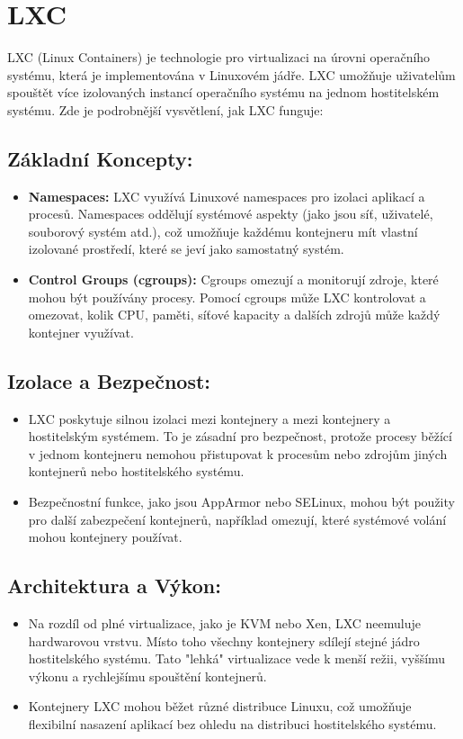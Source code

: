 \section{LXC}
LXC (Linux Containers) je technologie pro virtualizaci na úrovni operačního systému, která je implementována v Linuxovém jádře. LXC umožňuje uživatelům spouštět více izolovaných instancí operačního systému na jednom hostitelském systému. Zde je podrobnější vysvětlení, jak LXC funguje:

\subsection{Základní Koncepty:}
\begin{itemize}[label=]
    \item \textbf{Namespaces:} LXC využívá Linuxové namespaces pro izolaci aplikací a procesů. Namespaces oddělují systémové aspekty (jako jsou síť, uživatelé, souborový systém atd.), což umožňuje každému kontejneru mít vlastní izolované prostředí, které se jeví jako samostatný systém.
    \item \textbf{Control Groups (cgroups):} Cgroups omezují a monitorují zdroje, které mohou být používány procesy. Pomocí cgroups může LXC kontrolovat a omezovat, kolik CPU, paměti, síťové kapacity a dalších zdrojů může každý kontejner využívat.
\end{itemize}

\subsection{Izolace a Bezpečnost:}
\begin{itemize}[label=]
    \item LXC poskytuje silnou izolaci mezi kontejnery a mezi kontejnery a hostitelským systémem. To je zásadní pro bezpečnost, protože procesy běžící v jednom kontejneru nemohou přistupovat k procesům nebo zdrojům jiných kontejnerů nebo hostitelského systému.
    \item Bezpečnostní funkce, jako jsou AppArmor nebo SELinux, mohou být použity pro další zabezpečení kontejnerů, například omezují, které systémové volání mohou kontejnery používat.
\end{itemize}

\subsection{Architektura a Výkon:}
\begin{itemize}[label=]
    \item Na rozdíl od plné virtualizace, jako je KVM nebo Xen, LXC neemuluje hardwarovou vrstvu. Místo toho všechny kontejnery sdílejí stejné jádro hostitelského systému. Tato "lehká" virtualizace vede k menší režii, vyššímu výkonu a rychlejšímu spouštění kontejnerů.
    \item Kontejnery LXC mohou běžet různé distribuce Linuxu, což umožňuje flexibilní nasazení aplikací bez ohledu na distribuci hostitelského systému.
\end{itemize}

